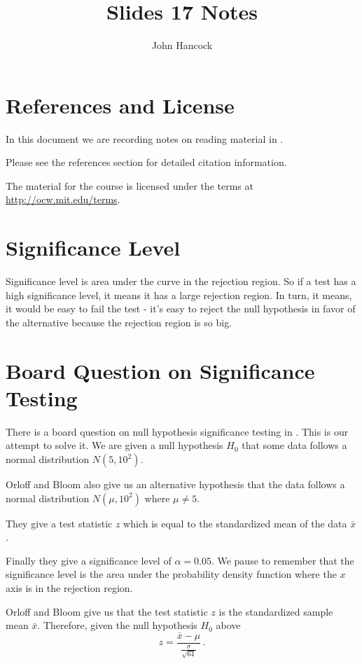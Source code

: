 \documentclass[a5paper,11pt]{article}
\author{John Hancock}
\title{Slides 17 Notes}
\begin{document}
\maketitle

\tableofcontents

\section{References and License}

In this document we are recording notes on reading material in
\cite{classSlides17}.

Please see the references section for detailed citation information.

The material for the course is licensed under the terms at
\url{http://ocw.mit.edu/terms}.

\section{Significance Level}
Significance level is area under the curve in the rejection region. So if
a test has a high significance level, it means it has a large rejection
region. In turn, it means, it would be easy to fail the test - it's easy
to reject the null hypothesis in favor of the alternative because the
rejection region is so big.

\section{Board Question on Significance Testing}
There is a board question on null hypothesis significance testing in
\cite{classSlides17}.  This is our attempt to solve it.
We are given a null hypothesis $H_0$ that some data follows a normal 
distribution $N\left(5, 10^2 \right)$.

Orloff and Bloom also give us an alternative hypothesis that the data follows
a normal distribution $N\left(\mu, 10^2\right)$ where $\mu  \neq 5$.

They give a test statistic $z$ which is equal to the standardized mean of the
data $\bar{x}$.

Finally they give a significance level of $\alpha = 0.05$.  We pause to 
remember that the significance level is the area under the probability 
density function where the $x$ axis is in the rejection region.

Orloff and Bloom give us that the test statistic $z$ is the standardized
sample mean $\bar{x}$.  Therefore, given the null hypothesis $H_0$ above 
\begin{equation}
z=\frac{\bar{x} -\mu}{\frac{\sigma}{\sqrt{64}}}\,.
\end{equation} 
\end{document}
